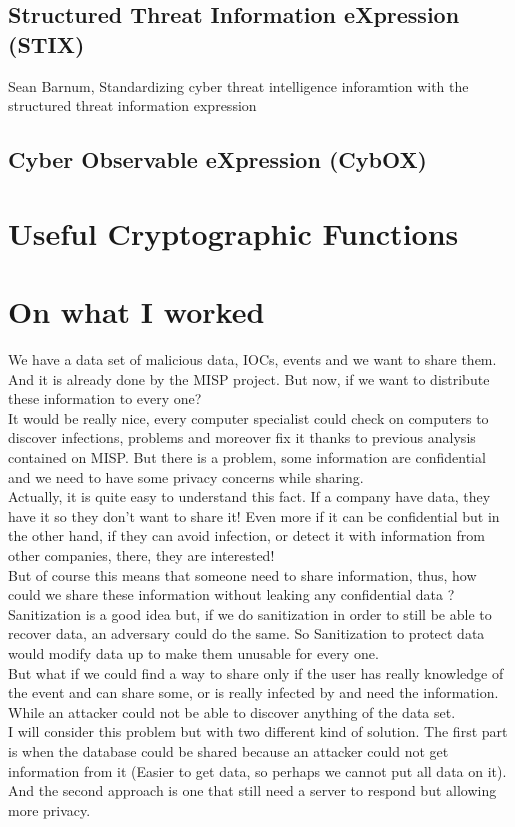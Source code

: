 \documentclass{eplmastersthesis}
\begin{document}
\subsection{Structured Threat Information eXpression (STIX)}
Sean  Barnum, Standardizing cyber threat intelligence inforamtion with the structured threat information expression

\subsection{Cyber Observable eXpression (CybOX)}


\section{Useful Cryptographic Functions}

\section{On what I worked}

We have a data set of malicious data, IOCs, events and we want to share them. And it is already done by the MISP project. But now, if we want to distribute these information to every one?\\
It would be really nice, every computer specialist could check on computers to discover infections, problems and moreover fix it thanks to previous analysis contained on MISP. But there is a problem, some information are confidential and we need to have some privacy concerns while sharing. \\
Actually, it is quite easy to understand this fact. If a company have data, they have it so they don't want to share it! Even more if it can be confidential but in the other hand, if they can avoid infection, or detect it with information from other companies, there, they are interested! \\
But of course this means that someone need to share information, thus, how could we share these information without leaking any confidential data ?\\
Sanitization is a good idea but, if we do sanitization in order to still be able to recover data, an adversary could do the same. So Sanitization to protect data would modify data up to make them unusable for every one.\\
But what if we could find a way to share only if the user has really knowledge of the event and can share some, or is really infected by and need the information. While an attacker could not be able to discover anything of the data set.\\
I will consider this problem but with two different kind of solution. The first part is when the database could be shared because an attacker could not get information from it (Easier to get data, so perhaps we cannot put all data on it).\\
And the second approach is one that still need a server to respond but allowing more privacy.\\
\end{document}
